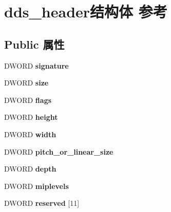 \hypertarget{structdds__header}{}\section{dds\+\_\+header结构体 参考}
\label{structdds__header}
\subsection*{Public 属性}
\begin{DoxyCompactItemize}
\item 
\mbox{\label{structdds__header_a2db331d1678cc7f3b80f334983844698}} 
D\+W\+O\+RD {\bfseries signature}
\item 
\mbox{\label{structdds__header_ad7d0df124d358813b51971f188a0e416}} 
D\+W\+O\+RD {\bfseries size}
\item 
\mbox{\label{structdds__header_a6ac74536a3d44d9f078f0560db480a03}} 
D\+W\+O\+RD {\bfseries flags}
\item 
\mbox{\label{structdds__header_ae810977afeb32c89837a64bc6b04d544}} 
D\+W\+O\+RD {\bfseries height}
\item 
\mbox{\label{structdds__header_a8942b066b09ec05593a880f226b0a0c2}} 
D\+W\+O\+RD {\bfseries width}
\item 
\mbox{\label{structdds__header_ab1ae83bf5c07ac552256d2d2a31fd170}} 
D\+W\+O\+RD {\bfseries pitch\+\_\+or\+\_\+linear\+\_\+size}
\item 
\mbox{\label{structdds__header_a5532b5e3f2b918066d40c161a441cfac}} 
D\+W\+O\+RD {\bfseries depth}
\item 
\mbox{\label{structdds__header_ad7fca81e39dbaf605e873142ed003db9}} 
D\+W\+O\+RD {\bfseries miplevels}
\item 
\mbox{\label{structdds__header_acf05eef1e1c7e85f9278d32eda161c75}} 
D\+W\+O\+RD {\bfseries reserved} \mbox{[}11\mbox{]}
\item 
\mbox{\label{structdds__header_a248a3f7ba18c56b60f80ff440415844f}} 

\end{DoxyCompactItemize}
